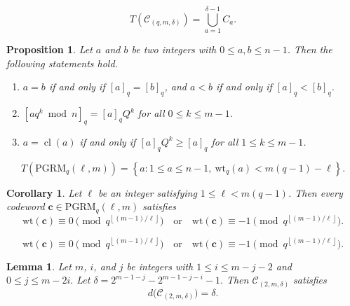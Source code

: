 \documentclass[10pt,a4paper]{amsart}
\newtheorem{proposition}{Proposition}
\newtheorem{corollary}{Corollary}
\newtheorem{lemma}{Lemma}
\newcommand{\PGRM}{\mathrm{PGRM}}
\newcommand{\cl}{\operatorname{cl}}
\newcommand{\wt}{\mathrm{wt}}
\newcommand{\wtq}{\mathrm{wt}_q}
\begin{document}
\begin{equation}\label{pre1}
  T(\mathcal{C}_{(q,m,\delta)}) = \bigcup_{a=1}^{\delta-1} C_a.
\end{equation}

\begin{proposition}\label{properties}
Let $a$ and $b$ be two integers with $0\leq a,b\leq n-1$. Then the following
statements hold.
\begin{enumerate}
    \item  $a=b$ if and only if $[a]_q=[b]_q$, and $a<b$ if and
    only if $[a]_q<[b]_q$.
    \item 
    $
    [a q^k\bmod n]_q=[a]_qQ^k
$  for all $0\leq k\leq m-1$.
    \item  $a=\cl(a)$  if and only if
    $
    [a]_qQ^k\geq  [a]_q
   $ 
    for all $1\leq k\leq m-1$.
\end{enumerate}
\end{proposition}

\begin{equation}\label{eqdef}
T\left(\mathrm{PGRM}_q(\ell,m)\right)
=
\left\{
a:
1\leq a\leq n-1,\ 
\wtq(a)<m(q-1)-\ell
\right\}.
\end{equation}

\begin{corollary}\label{lemma2}
Let $\ell$ be an integer satisfying $1\leq \ell<m(q-1)$. Then every codeword
$\mathbf{c}\in\PGRM_q(\ell,m)$ satisfies
\begin{equation}\label{contra}
\wt(\mathbf{c})
\equiv 0
\pmod{q^{\left\lfloor (m-1)/\ell\right\rfloor}}
\quad\text{or}\quad
\wt(\mathbf{c})
\equiv -1
\pmod{q^{\left\lfloor (m-1)/\ell\right\rfloor}}.
\end{equation}
\end{corollary}

\begin{equation}
\wt(\mathbf{c})
\equiv 0
\pmod{q^{\left\lfloor (m-1)/\ell\right\rfloor}}
\quad\text{or}\quad
\wt(\mathbf{c})
\equiv -1
\pmod{q^{\left\lfloor (m-1)/\ell\right\rfloor}}.
\end{equation}

\begin{lemma}\textnormal{\cite{KasamiLin1972}}\label{kl}
Let $m$, $i$, and $j$  be integers with 
$
1\leq i\leq m-j-2$ and 
$0\leq j\leq m-2i.
$ Let $\delta=2^{m-1-j}-2^{m-1-j-i}-1.
$ 
Then
$\mathcal{C}_{(2,m,\delta)}$ satisfies
\begin{equation*}
d\bigl(\mathcal{C}_{(2,m,\delta)}\bigr)=\delta.
\end{equation*}
\end{lemma}
\end{document}
